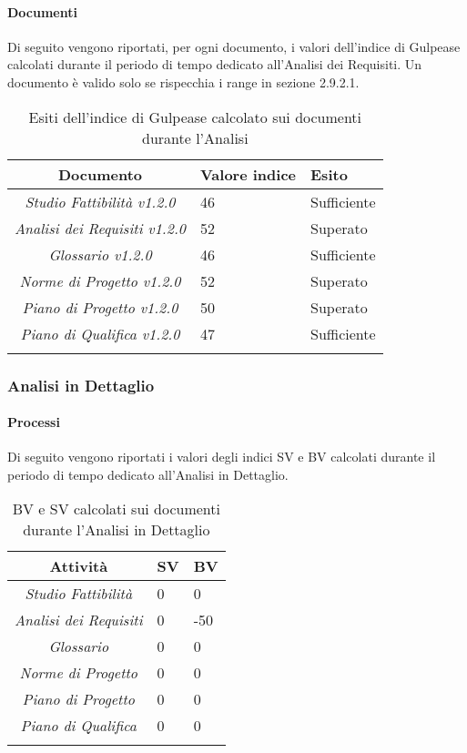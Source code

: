 \paragraph{Documenti}
Di seguito vengono riportati, per ogni documento, i valori dell'indice di Gulpease calcolati durante il periodo di tempo dedicato all'Analisi dei Requisiti. Un documento è valido solo se rispecchia i range in sezione 2.9.2.1.
\begin{longtable}{|c|p{3cm}|p{3cm}|}
\toprule
\textbf{Documento} & \textbf{Valore indice} & \textbf{Esito} \\


\midrule
\emph{Studio Fattibilità v1.2.0} & 46 & Sufficiente\\
\midrule
\emph{Analisi dei Requisiti v1.2.0} & 52 & Superato\\
\midrule
\emph{Glossario v1.2.0} & 46 & Sufficiente\\
\midrule
\emph{Norme di Progetto v1.2.0} & 52 & Superato\\
\midrule
\emph{Piano di Progetto v1.2.0} & 50 & Superato\\
\midrule
\emph{Piano di Qualifica v1.2.0} & 47 & Sufficiente\\
\bottomrule
\caption{Esiti dell'indice di Gulpease calcolato sui documenti durante l'Analisi}
\label{tab:changelog}
\end{longtable}

\subsubsection{Analisi in Dettaglio}
\paragraph{Processi}
Di seguito vengono riportati i valori degli indici SV e BV calcolati durante il periodo di tempo dedicato all'Analisi in Dettaglio.
\begin{longtable}{|c|p{3cm}|p{3cm}|}
\toprule
\textbf{Attività} & \textbf{SV} & \textbf{BV} \\


\midrule
\emph{Studio Fattibilità} & 0 & 0 \\
\midrule
\emph{Analisi dei Requisiti} & 0 & -50\\
\midrule
\emph{Glossario} & 0  & 0\\
\midrule
\emph{Norme di Progetto} & 0 & 0\\
\midrule
\emph{Piano di Progetto} & 0 & 0\\
\midrule
\emph{Piano di Qualifica} & 0 & 0\\
\bottomrule
\caption{BV e SV calcolati sui documenti durante l'Analisi in Dettaglio}
\label{tab:changelog}
\end{longtable}


